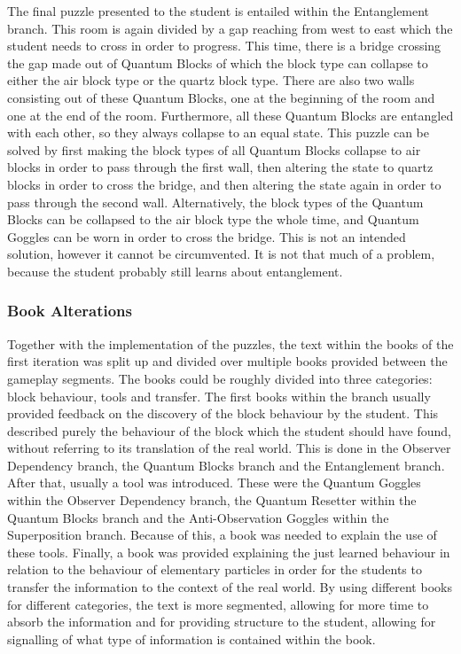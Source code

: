 \documentclass[11pt,twoside]{report} %
\begin{document}
The final puzzle presented to the student is entailed within the Entanglement branch. This room is again divided by a gap reaching from west to east which the student needs to cross in order to progress. This time, there is a bridge crossing the gap made out of Quantum Blocks of which the block type can collapse to either the air block type or the quartz block type. There are also two walls consisting out of these Quantum Blocks, one at the beginning of the room and one at the end of the room. Furthermore, all these Quantum Blocks are entangled with each other, so they always collapse to an equal state. This puzzle can be solved by first making the block types of all Quantum Blocks collapse to air blocks in order to pass through the first wall, then altering the state to quartz blocks in order to cross the bridge, and then altering the state again in order to pass through the second wall. Alternatively, the block types of the Quantum Blocks can be collapsed to the air block type the whole time, and Quantum Goggles can be worn in order to cross the bridge. This is not an intended solution, however it cannot be circumvented. It is not that much of a problem, because the student probably still learns about entanglement.

\subsubsection{Book Alterations}

Together with the implementation of the puzzles, the text within the books of the first iteration was split up and divided over multiple books provided between the gameplay segments. The books could be roughly divided into three categories: block behaviour, tools and transfer. The first books within the branch usually provided feedback on the discovery of the block behaviour by the student. This described purely the behaviour of the block which the student should have found, without referring to its translation of the real world. This is done in the Observer Dependency branch, the Quantum Blocks branch and the Entanglement branch. After that, usually a tool was introduced. These were the Quantum Goggles within the Observer Dependency branch, the Quantum Resetter within the Quantum Blocks branch and the Anti-Observation Goggles within the Superposition branch. Because of this, a book was needed to explain the use of these tools. Finally, a book was provided explaining the just learned behaviour in relation to the behaviour of elementary particles in order for the students to transfer the information to the context of the real world. By using different books for different categories, the text is more segmented, allowing for more time to absorb the information and for providing structure to the student, allowing for signalling of what type of information is contained within the book.
\end{document}
